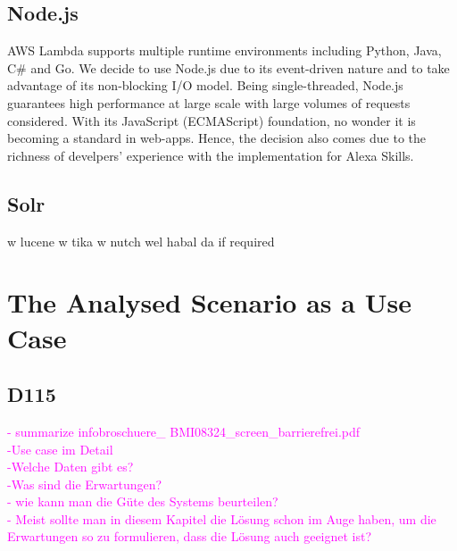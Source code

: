 \subsection*{Node.js}

AWS Lambda supports multiple runtime environments including Python, Java, C\# and Go. We decide to use Node.js due to its event-driven nature and to take advantage of its non-blocking I/O model. Being single-threaded, Node.js guarantees high performance at large scale with large volumes of requests considered. With its JavaScript (ECMAScript) foundation, no wonder it is becoming a standard in web-apps. Hence, the decision also comes due to the richness of develpers' experience with the implementation for Alexa Skills.


\subsection*{Solr}
w lucene w tika w nutch wel habal da if required





\section{The Analysed Scenario as a Use Case}
\subsection*{D115}
\textcolor{magenta}{
	- summarize infobroschuere\_ BMI08324\_screen\_barrierefrei.pdf\\
	-Use case im Detail\\
	-Welche Daten gibt es?\\	  
	-Was sind die Erwartungen?\\ 	
	- wie kann man die G\"ute des Systems beurteilen?\\   
	- Meist sollte man in diesem Kapitel die L\"osung schon im Auge haben, um die Erwartungen so zu formulieren, dass die L\"osung auch geeignet ist?\\ 
}





